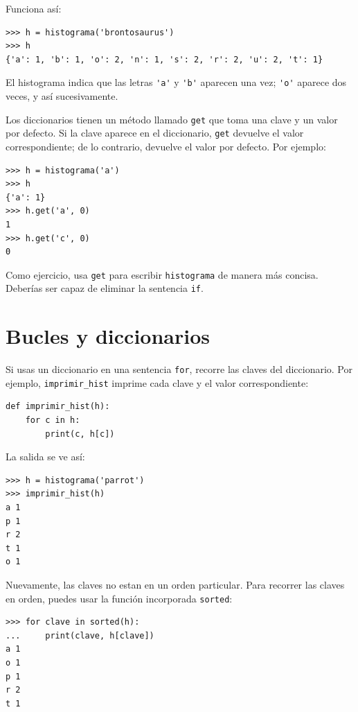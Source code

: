 \documentclass[10pt]{book}
\begin{document}
Funciona así:

\begin{verbatim}
>>> h = histograma('brontosaurus')
>>> h
{'a': 1, 'b': 1, 'o': 2, 'n': 1, 's': 2, 'r': 2, 'u': 2, 't': 1}
\end{verbatim}
%
El histograma indica que las letras \verb"'a'" y \verb"'b'"
aparecen una vez; \verb"'o'" aparece dos veces, y así sucesivamente.


Los diccionarios tienen un método llamado {\tt get} que toma una clave
y un valor por defecto.  Si la clave aparece en el diccionario,
{\tt get} devuelve el valor correspondiente; de lo contrario, devuelve
el valor por defecto.  Por ejemplo:

\begin{verbatim}
>>> h = histograma('a')
>>> h
{'a': 1}
>>> h.get('a', 0)
1
>>> h.get('c', 0)
0
\end{verbatim}
%
Como ejercicio, usa {\tt get} para escribir {\tt histograma} de manera más concisa.
Deberías ser capaz de eliminar la sentencia {\tt if}.


\section{Bucles y diccionarios}

Si usas un diccionario en una sentencia {\tt for}, recorre
las claves del diccionario.  Por ejemplo, \verb"imprimir_hist"
imprime cada clave y el valor correspondiente:

\begin{verbatim}
def imprimir_hist(h):
    for c in h:
        print(c, h[c])
\end{verbatim}
%
La salida se ve así:

\begin{verbatim}
>>> h = histograma('parrot')
>>> imprimir_hist(h)
a 1
p 1
r 2
t 1
o 1
\end{verbatim}
%
Nuevamente, las claves no estan en un orden particular.  Para recorrer las claves
en orden, puedes usar la función incorporada {\tt sorted}:

\begin{verbatim}
>>> for clave in sorted(h):
...     print(clave, h[clave])
a 1
o 1
p 1
r 2
t 1
\end{verbatim}

\end{document}
